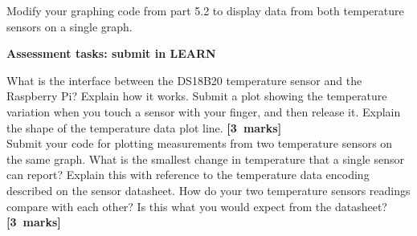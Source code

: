 \begin{enumerate}

%


Modify your graphing code from part 5.2 to display data from both temperature sensors on a single graph.


\end{enumerate}

{\bf Assessment tasks: submit in LEARN}

What is the interface between the DS18B20 temperature sensor and the Raspberry Pi?
Explain how it works.
Submit a plot showing the temperature variation when you touch a sensor with your finger, and then release it.
Explain the shape of the temperature data plot line.
\hfill {\bf[3~marks]} \\

Submit your code for plotting measurements from two temperature sensors on the same graph.
What is the smallest change in temperature that a single sensor can report?
Explain this with reference to the temperature data encoding described on the sensor datasheet.
How do your two temperature sensors readings compare with each other?
Is this what you would expect from the datasheet?
\hfill {\bf[3~marks]} \\


